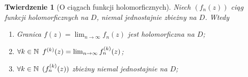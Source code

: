 \documentclass[11pt]{article}
\theoremstyle{plain}
\newtheorem*{theorem}{Twierdzenie}
\theoremstyle{definition}
\theoremstyle{remark}
\begin{document}
\begin{theorem}[O ciągach funkcji holomorficznych]
  Niech $ (f_n(z)) $ ciąg funkcji holomorficznych na $D$, niemal jednostajnie zbieżny na $D$. Wtedy

  \begin{enumerate}
    \item Granica $ f(z) = \lim_{n \to \infty} f_n(z) $ jest holomorficzna na $ D $; \label{ciagi-holo-f}
    \item $ \forall k \in \mathbb{N}\enskip f^{(k)}(z) = \lim_{n \to \infty} f_n^{(k)}(z) $; \label{ciagi-holo-pochodne}
    \item $ \forall k \in \mathbb{N}\enskip (f_n^{(k)}(z)) $ zbieżny niemal jednostajnie na $D$; \label{ciagi-holo-pochodne-zb}
  \end{enumerate}
\end{theorem}
\end{document}
